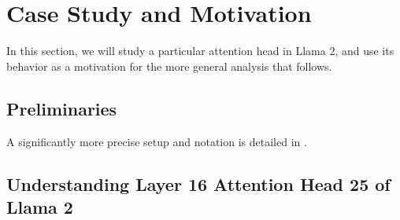 \section{Case Study and Motivation}\label{sec:case_study}

In this section, we will study a particular attention head in Llama 2, and use its behavior as a motivation for the more general analysis that follows.

\subsection{Preliminaries}\label{sub:prelim}



A significantly more precise setup and notation is detailed in .

\subsection{Understanding Layer 16 Attention Head 25 of Llama 2}\label{sub:case_study_l25_h16}

